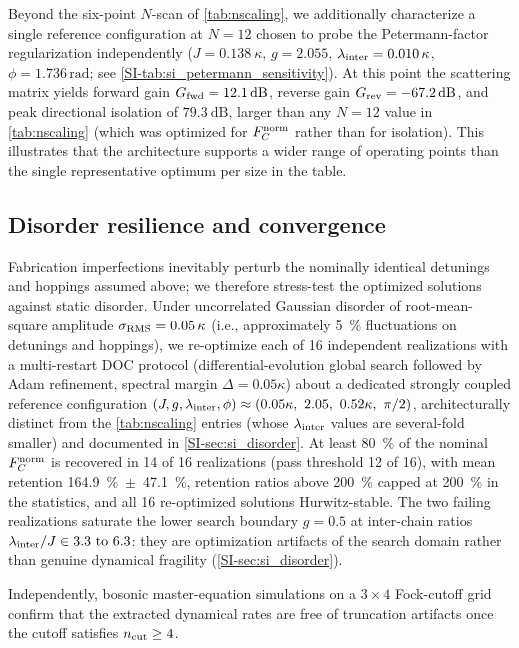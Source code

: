 \documentclass[aps,prxquantum,preprint,superscriptaddress,amsmath,amssymb]{revtex4-2}
\newcommand{\Fnorm}{F_C^{\rm norm}}
\newcommand{\Gfwd}{G_{\rm fwd}}
\newcommand{\Grev}{G_{\rm rev}}
\newcommand{\lint}{\lambda_{\rm inter}}
\begin{document}
Beyond the six-point $N$-scan of \cref{tab:nscaling}, we additionally characterize a single reference configuration at $N=\num{12}$ chosen to probe the Petermann-factor regularization independently ($J=\qty{0.138}{\kappa}$, $g=\num{2.055}$, $\lint=\qty{0.010}{\kappa}$, $\phi=\num{1.736}\,\mathrm{rad}$; see \cref{SI-tab:si_petermann_sensitivity}). At this point the scattering matrix yields forward gain $\Gfwd=\qty{+12.1}{\dB}$, reverse gain $\Grev=\qty{-67.2}{\dB}$, and peak directional isolation of $\qty{79.3}{\dB}$, larger than any $N=\num{12}$ value in \cref{tab:nscaling} (which was optimized for $\Fnorm$ rather than for isolation). This illustrates that the architecture supports a wider range of operating points than the single representative optimum per size in the table.

\subsection{Disorder resilience and convergence}
\label{sec:disorder}

Fabrication imperfections inevitably perturb the nominally identical detunings and hoppings assumed above; we therefore stress-test the optimized solutions against static disorder. Under uncorrelated Gaussian disorder of root-mean-square amplitude $\sigma_{\rm RMS}=\qty{0.05}{\kappa}$ (i.e., approximately \qty{5}{\percent} fluctuations on detunings and hoppings), we re-optimize each of 16 independent realizations with a multi-restart DOC protocol (differential-evolution global search followed by Adam refinement, spectral margin $\Delta=\num{0.05}\kappa$) about a dedicated strongly coupled reference configuration $(J,g,\lint,\phi)\approx(\num{0.05}\kappa,\ \num{2.05},\ \num{0.52}\kappa,\ \pi/2)$, architecturally distinct from the \cref{tab:nscaling} entries (whose $\lint$ values are several-fold smaller) and documented in \cref{SI-sec:si_disorder}. At least \qty{80}{\percent} of the nominal $\Fnorm$ is recovered in 14 of 16 realizations (pass threshold 12 of 16), with mean retention \qty{164.9}{\percent}~$\pm$~\qty{47.1}{\percent}, retention ratios above \qty{200}{\percent} capped at \qty{200}{\percent} in the statistics, and all 16 re-optimized solutions Hurwitz-stable. The two failing realizations saturate the lower search boundary $g=\num{0.5}$ at inter-chain ratios $\lint/J\in\numrange{3.3}{6.3}$: they are optimization artifacts of the search domain rather than genuine dynamical fragility (\cref{SI-sec:si_disorder}).

Independently, bosonic master-equation simulations on a $3\times4$ Fock-cutoff grid confirm that the extracted dynamical rates are free of truncation artifacts once the cutoff satisfies $n_{\rm cut}\ge4$.
\end{document}
